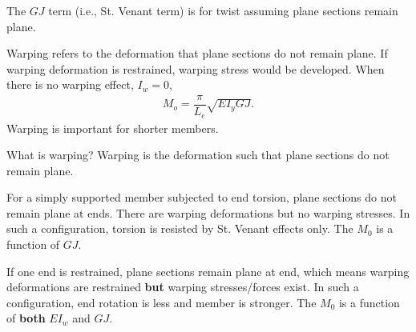 The $GJ$ term (i.e., St. Venant term) is for twist assuming plane sections remain plane.
\begin{figure}[H]
\centering

\end{figure}

Warping refers to the deformation that plane sections do not remain plane.
If warping deformation is restrained, warping stress would be developed.
When there is no warping effect, $I_w=0$,
\begin{gather}\label{eq:no_warp}
M_o=\dfrac{\pi}{L_e}\sqrt{EI_yGJ}.
\end{gather}
Warping is important for shorter members.

What is warping?
Warping is the deformation such that plane sections do not remain plane.

For a simply supported member subjected to end torsion, plane sections do not remain plane at ends.
There are warping deformations but no warping stresses.
In such a configuration, torsion is resisted by St. Venant effects only.
The $M_0$ is a function of $GJ$.
\begin{figure}[H]
\centering\footnotesize

\end{figure}

If one end is restrained, plane sections remain plane at end, which means warping deformations are restrained \textbf{but} warping stresses/forces exist.
In such a configuration, end rotation is less and member is stronger.
The $M_0$ is a function of \textbf{both} $EI_w$ and $GJ$.
\begin{figure}[H]
\centering\footnotesize

\end{figure}

